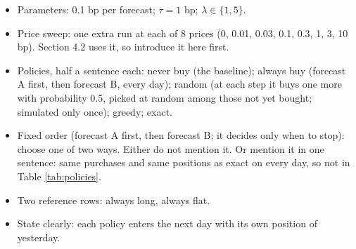 \documentclass{article}
\newenvironment{pts}{\begin{itemize}[nosep,leftmargin=1.15em,topsep=1pt]}{\end{itemize}}
\begin{document}
\begin{note}
\begin{pts}
\item Parameters: 0.1 bp per forecast; $\tau = 1$ bp; $\lambda \in \{1, 5\}$.
\item Price sweep: one extra run at each of 8 prices (0, 0.01, 0.03, 0.1, 0.3, 1, 3, 10 bp). Section 4.2 uses it, so introduce it here first.
\item Policies, half a sentence each: never buy (the baseline); always buy (forecast A first, then forecast B, every day); random (at each step it buys one more with probability 0.5, picked at random among those not yet bought; simulated only once); greedy; exact.
\item Fixed order (forecast A first, then forecast B; it decides only when to stop): choose one of two ways. Either do not mention it. Or mention it in one sentence: same purchases and same positions as exact on every day, so not in Table \ref{tab:policies}.
\item Two reference rows: always long, always flat.
\item State clearly: each policy enters the next day with its own position of yesterday.
\end{pts}
\end{note}
\end{document}
